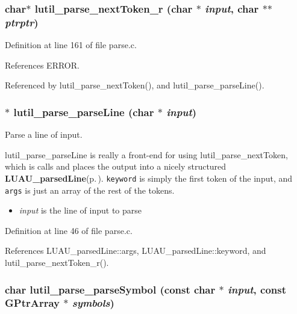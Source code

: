 \subsubsection{\setlength{\rightskip}{0pt plus 5cm}char$\ast$ lutil\_\-parse\_\-next\-Token\_\-r (char $\ast$ {\em input}, char $\ast$$\ast$ {\em ptrptr})}\label{parse_8h_a5}




Definition at line 161 of file parse.c.

References ERROR.

Referenced by lutil\_\-parse\_\-next\-Token(), and lutil\_\-parse\_\-parse\-Line().
\subsubsection{$\ast$ lutil\_\-parse\_\-parse\-Line (char $\ast$ {\em input})}\label{parse_8h_a0}


Parse a line of input. 

lutil\_\-parse\_\-parse\-Line is really a front-end for using lutil\_\-parse\_\-next\-Token, which is calls and places the output into a nicely structured {\bf LUAU\_\-parsed\-Line}{\rm (p.\,\pageref{structLUAU__parsedLine})}. {\tt keyword} is simply the first token of the input, and {\tt args} is just an array of the rest of the tokens.

\begin{itemize}
\item {\em input\/} is the line of input to parse 
\end{itemize}


Definition at line 46 of file parse.c.

References LUAU\_\-parsed\-Line::args, LUAU\_\-parsed\-Line::keyword, and lutil\_\-parse\_\-next\-Token\_\-r().
\subsubsection{\setlength{\rightskip}{0pt plus 5cm}char lutil\_\-parse\_\-parse\-Symbol (const char $\ast$ {\em input}, const GPtr\-Array $\ast$ {\em symbols})}\label{parse_8h_a1}


